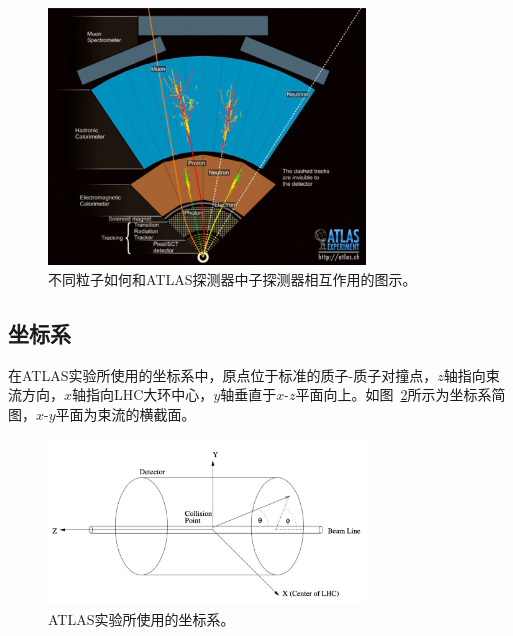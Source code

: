 \begin{figure}
  \begin{center}
    \includegraphics[width=0.75\textwidth]{figuresEXP/ATLAS2.jpg}
  \end{center}
  \caption{
 不同粒子如何和\textsc{ATLAS}探测器中子探测器相互作用的图示。
  }
    \label{fig:ATLAS2}
\end{figure}

\subsection{坐标系}
\label{sec:ATLASCS}

在\textsc{ATLAS}实验所使用的坐标系中，原点位于标准的质子-质子对撞点，$z$轴指向束流方向，$x$轴指向LHC大环中心，$y$轴垂直于$x$-$z$平面向上。如图~\ref{fig:ATLAS3}所示为坐标系简图，$x$-$y$平面为束流的横截面。

\begin{figure}
  \begin{center}
    \includegraphics[width=0.75\textwidth]{figuresEXP/ATLAS3.jpg}
  \end{center}
  \caption{
 \textsc{ATLAS}实验所使用的坐标系。
  }
    \label{fig:ATLAS3}
\end{figure}

